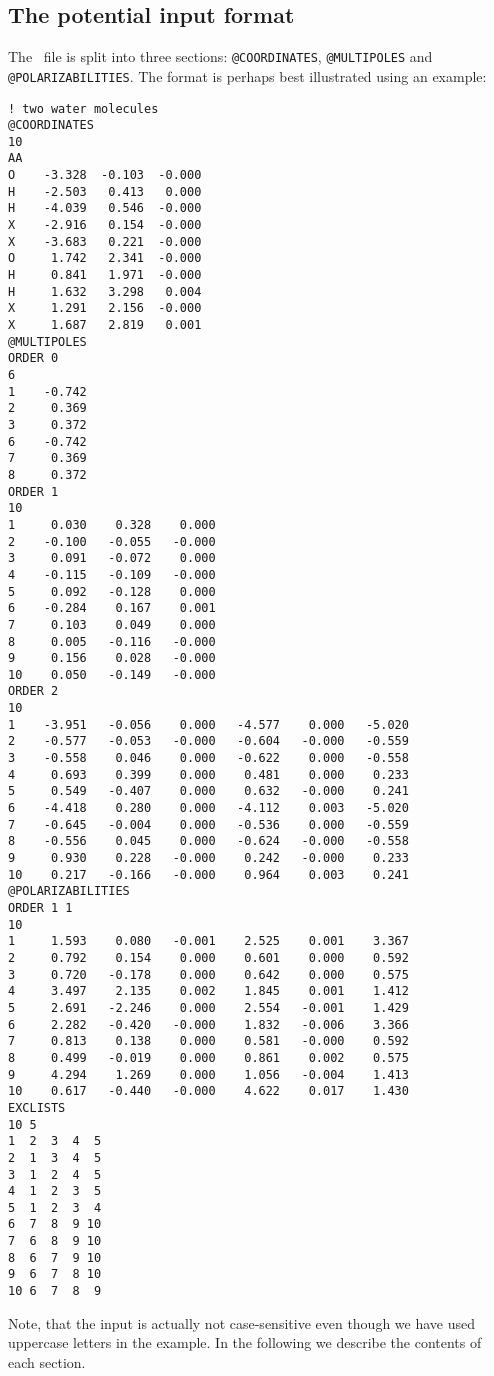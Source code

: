 \subsection*{The potential input format}
The \potinp\ file is split into three sections: \verb|@COORDINATES|,
\verb|@MULTIPOLES| and \verb|@POLARIZABILITIES|. The format is perhaps best
illustrated using an example:
\begin{verbatim}
! two water molecules
@COORDINATES
10
AA
O    -3.328  -0.103  -0.000
H    -2.503   0.413   0.000
H    -4.039   0.546  -0.000
X    -2.916   0.154  -0.000
X    -3.683   0.221  -0.000
O     1.742   2.341  -0.000
H     0.841   1.971  -0.000
H     1.632   3.298   0.004
X     1.291   2.156  -0.000
X     1.687   2.819   0.001
@MULTIPOLES
ORDER 0
6
1    -0.742
2     0.369
3     0.372
6    -0.742
7     0.369
8     0.372
ORDER 1
10
1     0.030    0.328    0.000
2    -0.100   -0.055   -0.000
3     0.091   -0.072    0.000
4    -0.115   -0.109   -0.000
5     0.092   -0.128    0.000
6    -0.284    0.167    0.001
7     0.103    0.049    0.000
8     0.005   -0.116   -0.000
9     0.156    0.028   -0.000
10    0.050   -0.149   -0.000
ORDER 2
10
1    -3.951   -0.056    0.000   -4.577    0.000   -5.020
2    -0.577   -0.053   -0.000   -0.604   -0.000   -0.559
3    -0.558    0.046    0.000   -0.622    0.000   -0.558
4     0.693    0.399    0.000    0.481    0.000    0.233
5     0.549   -0.407    0.000    0.632   -0.000    0.241
6    -4.418    0.280    0.000   -4.112    0.003   -5.020
7    -0.645   -0.004    0.000   -0.536    0.000   -0.559
8    -0.556    0.045    0.000   -0.624   -0.000   -0.558
9     0.930    0.228   -0.000    0.242   -0.000    0.233
10    0.217   -0.166   -0.000    0.964    0.003    0.241
@POLARIZABILITIES
ORDER 1 1
10
1     1.593    0.080   -0.001    2.525    0.001    3.367
2     0.792    0.154    0.000    0.601    0.000    0.592
3     0.720   -0.178    0.000    0.642    0.000    0.575
4     3.497    2.135    0.002    1.845    0.001    1.412
5     2.691   -2.246    0.000    2.554   -0.001    1.429
6     2.282   -0.420   -0.000    1.832   -0.006    3.366
7     0.813    0.138    0.000    0.581   -0.000    0.592
8     0.499   -0.019    0.000    0.861    0.002    0.575
9     4.294    1.269    0.000    1.056   -0.004    1.413
10    0.617   -0.440   -0.000    4.622    0.017    1.430
EXCLISTS
10 5
1  2  3  4  5
2  1  3  4  5
3  1  2  4  5
4  1  2  3  5
5  1  2  3  4
6  7  8  9 10
7  6  8  9 10
8  6  7  9 10
9  6  7  8 10
10 6  7  8  9
\end{verbatim}
Note, that the input is actually not case-sensitive even though we have used
uppercase letters in the example. In the following we describe the
contents of each section.\\

